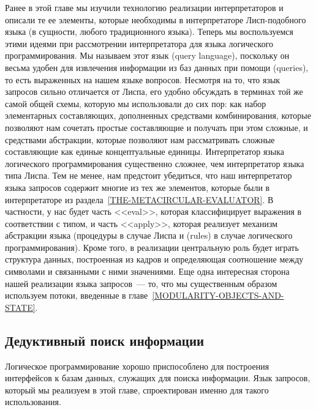 Ранее в этой главе мы изучили технологию реализации
интерпретаторов и описали те ее элементы, которые необходимы в
интерпретаторе Лисп-подобного языка (в сущности, любого традиционного
языка).  
Теперь мы воспользуемся этими идеями при рассмотрении
интерпретатора для языка логического программирования.  Мы называем
этот язык  (query language),
поскольку он весьма удобен для извлечения информации из баз данных
при помощи
(queries), то есть выраженных на
нашем языке вопросов.  Несмотря на то, что язык запросов сильно
отличается от Лиспа, его удобно обсуждать в терминах той
же самой общей схемы, которую мы использовали до сих пор: как набор
элементарных составляющих, дополненных средствами комбинирования, которые
позволяют нам сочетать простые составляющие и получать при этом
сложные, и средствами абстракции, которые позволяют нам
рассматривать сложные составляющие как единые концептуальные единицы.
Интерпретатор языка логического программирования существенно сложнее,
чем интерпретатор языка типа Лиспа.  Тем не менее, нам предстоит
убедиться, что наш 
интерпретатор языка запросов содержит многие из тех же элементов,
которые были в интерпретаторе из 
раздела~\ref{THE-METACIRCULAR-EVALUATOR}.  В частности, у нас будет
часть <<eval>>, которая классифицирует выражения в соответствии с
типом, и часть <<apply>>, которая реализует механизм абстракции языка
(процедуры в случае Лиспа и  (rules) в
случае логического программирования).  Кроме того, в реализации
центральную роль будет играть структура данных, построенная из кадров
и определяющая соотношение между символами и связанными с ними
значениями.  Еще одна интересная сторона нашей реализации языка
запросов~--- то, что мы существенным образом используем потоки,
введенные в главе~\ref{MODULARITY-OBJECTS-AND-STATE}.

\subsection{Дедуктивный поиск информации}
\label{DEDUCTIVE-INFORMATION-RETRIEVAL}%

Логическое программирование хорошо приспособлено 
для построения интерфейсов к базам данных, служащих для поиска
информации. Язык запросов, который мы реализуем в этой главе,
спроектирован именно для такого использования.


